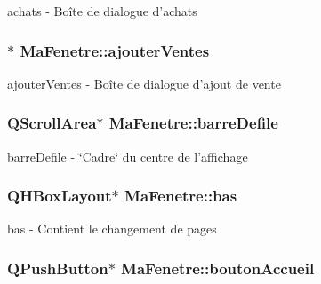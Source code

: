 achats -\/ Boîte de dialogue d'achats 

\hypertarget{class_ma_fenetre_a2332279c45b76ac1c9daf739c0bb3958}{
\subsubsection[{ajouter\-Ventes}]{$\ast$ Ma\-Fenetre\-::ajouter\-Ventes\hspace{0.3cm}{\ttfamily [protected]}}}\label{class_ma_fenetre_a2332279c45b76ac1c9daf739c0bb3958}


ajouter\-Ventes -\/ Boîte de dialogue d'ajout de vente 

\hypertarget{class_ma_fenetre_a4f199f65ae682c48c837875a486d2f3f}{
\subsubsection[{barre\-Defile}]{\setlength{\rightskip}{0pt plus 5cm}Q\-Scroll\-Area$\ast$ Ma\-Fenetre\-::barre\-Defile\hspace{0.3cm}{\ttfamily [protected]}}}\label{class_ma_fenetre_a4f199f65ae682c48c837875a486d2f3f}


barre\-Defile -\/ \char`\"{}\-Cadre\char`\"{} du centre de l'affichage 

\hypertarget{class_ma_fenetre_aff3315e53711db117feadab319660cee}{
\subsubsection[{bas}]{\setlength{\rightskip}{0pt plus 5cm}Q\-H\-Box\-Layout$\ast$ Ma\-Fenetre\-::bas\hspace{0.3cm}{\ttfamily [protected]}}}\label{class_ma_fenetre_aff3315e53711db117feadab319660cee}


bas -\/ Contient le changement de pages 

\hypertarget{class_ma_fenetre_a0316aa06b89b812a8528a8ccbe81561a}{
\subsubsection[{bouton\-Accueil}]{\setlength{\rightskip}{0pt plus 5cm}Q\-Push\-Button$\ast$ Ma\-Fenetre\-::bouton\-Accueil\hspace{0.3cm}{\ttfamily [protected]}}}\label{class_ma_fenetre_a0316aa06b89b812a8528a8ccbe81561a}



